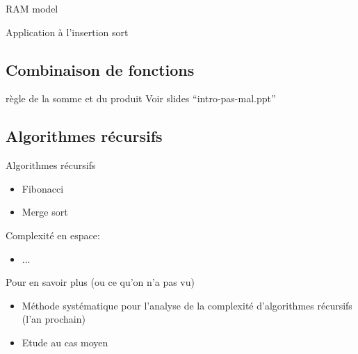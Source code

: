 


\begin{frame}{RAM model}

\end{frame}

\begin{frame}{Application à l'insertion sort}
\end{frame}

\subsection{Combinaison de fonctions}

\begin{frame}{règle de la somme et du produit}
Voir slides ``intro-pas-mal.ppt''
\end{frame}

\subsection{Algorithmes récursifs}

\begin{frame}{Algorithmes récursifs}

\begin{itemize}
\item Fibonacci
\item Merge sort
\end{itemize}

\end{frame}

\begin{frame}
Complexité en espace:
\begin{itemize}
\item ...
\end{itemize}
\end{frame}

\begin{frame}{Pour en savoir plus (ou ce qu'on n'a pas vu)}

\begin{itemize}
\item Méthode systématique pour l'analyse de la complexité d'algorithmes récursifs (l'an prochain)
\item Etude au cas moyen
\end{itemize}

\end{frame}



